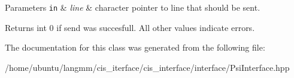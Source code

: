 \begin{DoxyParams}[1]{Parameters}
\mbox{\tt in}  & {\em line} & character pointer to line that should be sent. \\
\hline
\end{DoxyParams}
\begin{DoxyReturn}{Returns}
int 0 if send was succesfull. All other values indicate errors. 
\end{DoxyReturn}


The documentation for this class was generated from the following file\+:\begin{DoxyCompactItemize}
\item 
/home/ubuntu/langmm/cis\+\_\+iterface/cis\+\_\+interface/interface/Psi\+Interface.\+hpp\end{DoxyCompactItemize}
